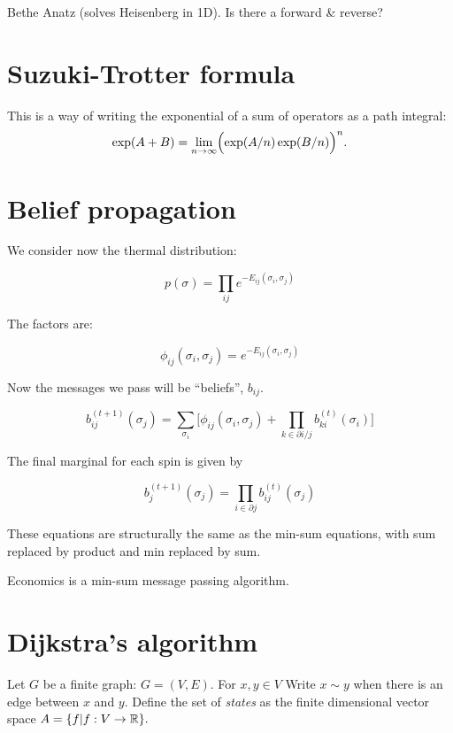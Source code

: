 \documentclass[11pt]{article}
\begin{document}
Bethe Anatz (solves Heisenberg in 1D). 
Is there a forward \& reverse?

\section{Suzuki-Trotter formula}

This is a way of writing the exponential of a sum of operators
as a path integral:
$$
\exp(A+B) = \lim_{n\to\infty} \Bigl(\exp(A/n)\exp(B/n)\Bigr)^n.
$$
 

\section{Belief propagation}



We consider now the thermal distribution:

$$
    p(\sigma) = \prod_{ij} e^{-E_{ij}(\sigma_i, \sigma_j)}
$$

The factors are:

$$
\phi_{ij}(\sigma_i, \sigma_j) = e^{-E_{ij}(\sigma_i, \sigma_j)}
$$

Now the messages we pass will be ``beliefs'', $b_{ij}$.

$$
b_{ij}^{(t+1)}(\sigma_j) = \sum_{\sigma_i}\bigl[ \phi_{ij}(\sigma_i, \sigma_j)
  + \prod_{k\in \partial i/j} b_{ki}^{(t)}(\sigma_i) \bigr]
$$

The final marginal for each spin is given by

$$
    b_j^{(t+1)}(\sigma_j) = \prod_{i\in \partial j} b_{ij}^{(t)}(\sigma_j)
$$

These equations are structurally the same as the
min-sum equations, with sum replaced by product and
min replaced by sum.




Economics is a min-sum message passing algorithm.



%
%

\section{Dijkstra's algorithm}

Let $G$ be a finite graph: $G = (V, E).$
For $x,y\in V$ Write $x\sim y$ when there
is an edge between $x$ and $y.$ %
Define the set of \emph{states} as %
the finite dimensional vector space
$A = \{ f | f : V \to \mathbb R \}.$
\end{document}
